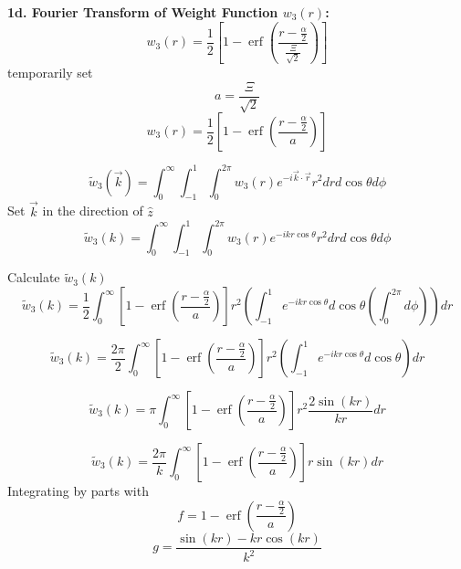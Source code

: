 \documentclass[12pt]{article}
\begin{document}
\[{}\]
\textbf{1d. Fourier Transform of Weight Function $w_{3}(r)$:}
\begin{equation}{w_3(r)=\frac{1}{2}\left[1-\operatorname{erf}\left(\frac{r-\frac{\alpha}{2}}{\frac{\Xi}{\sqrt{2}}}\right)\right]}\end{equation}
temporarily set 
\begin{equation}{a=\frac{\Xi}{\sqrt{2}}}\end{equation}
\begin{equation}{w_3(r)=\frac{1}{2}\left[1-\operatorname{erf}\left(\frac{r-\frac{\alpha}{2}}{a}\right)\right]}\end{equation}

\begin{equation}{\widetilde{w}_3(\vec{k})=\int_{0}^{\infty}\int_{-1}^{1}\int_{0}^{2\pi}w_3(r)e^{-i\vec{k}\cdot{\vec{r}}}r^2d{r}d{\cos\theta}d{\phi}}\end{equation}
Set $\vec{k}$ in the direction of $\hat{z}$ 
\begin{equation}{\widetilde{w}_3(k)=\int_{0}^{\infty}\int_{-1}^{1}\int_{0}^{2\pi}w_3(r)e^{-ikr\cos\theta}r^2d{r}d{\cos\theta}d{\phi}}\end{equation}

\noindent Calculate $\widetilde{w}_3(k)$ 
\begin{equation}{\widetilde{w}_3(k)=\frac{1}{2}\int_{0}^{\infty}\left[1-\operatorname{erf}\left(\frac{r-\frac{\alpha}{2}}{a}\right)\right]r^2\left(\int_{-1}^{1}e^{-ikr\cos\theta}d{\cos\theta}\left(\int_{0}^{2\pi}d{\phi}\right)\right)d{r}}\end{equation}
\[{}\]

\begin{equation}{\widetilde{w}_3(k)=\frac{2\pi}{2}\int_{0}^{\infty}\left[1-\operatorname{erf}\left(\frac{r-\frac{\alpha}{2}}{a}\right)\right]r^2\left(\int_{-1}^{1}e^{-ikr\cos\theta}d{\cos\theta}\right)d{r}}\end{equation}

\begin{equation}{\widetilde{w}_3(k)=\pi\int_{0}^{\infty}\left[1-\operatorname{erf}\left(\frac{r-\frac{\alpha}{2}}{a}\right)\right]r^2\frac{2\sin(kr)}{kr}d{r}}\end{equation}

\begin{equation}{\widetilde{w}_3(k)=\frac{2\pi}{k}\int_{0}^{\infty}\left[1-\operatorname{erf}\left(\frac{r-\frac{\alpha}{2}}{a}\right)\right]r\sin(kr)d{r}}\end{equation}
Integrating by parts with 
\begin{displaymath}{f=1-\operatorname{erf}\left(\frac{r-\frac{\alpha}{2}}{a}\right)}\end{displaymath}
\begin{displaymath}{g=\frac{\sin(kr)-kr\cos(kr)}{k^2}}\end{displaymath}
\end{document}
